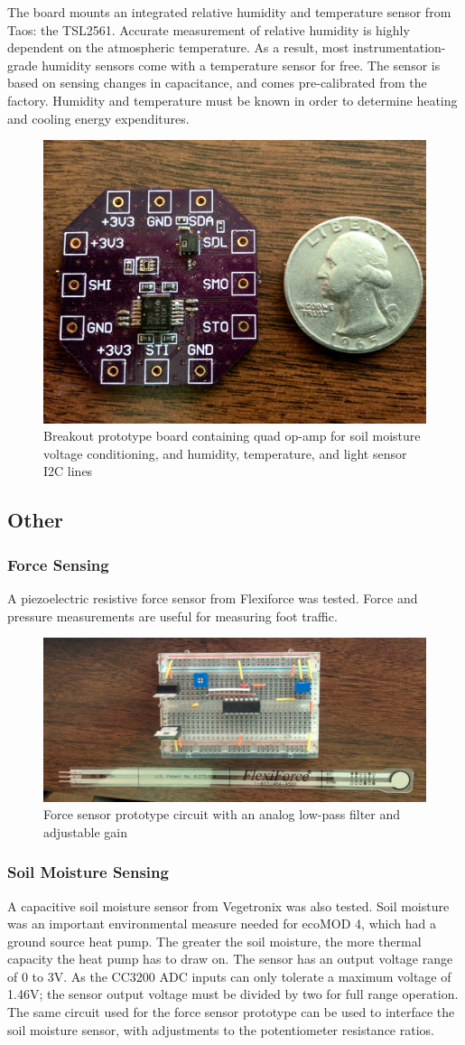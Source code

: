 The board mounts an integrated relative humidity and temperature sensor from Taos: the TSL2561. Accurate measurement of relative humidity is highly dependent on the atmospheric temperature. As a result, most instrumentation-grade humidity sensors come with a temperature sensor for free. The sensor is based on sensing changes in capacitance, and comes pre-calibrated from the factory. Humidity and temperature must be known in order to determine heating and cooling energy expenditures.

\begin{figure}[h]
\centering
\includegraphics[width=0.3\linewidth]{images/sbrk-proto}
\caption[Development breakout]{Breakout prototype board containing quad op-amp for soil moisture voltage conditioning, and humidity, temperature, and light sensor I2C lines}
\label{fig:sbrk-proto}
\end{figure}

\subsection{Other}
\subsubsection{Force Sensing}
A piezoelectric resistive force sensor from Flexiforce was tested. Force and pressure measurements are useful for measuring foot traffic. 

\begin{figure}[h]
\centering
\includegraphics[width=0.33\linewidth]{images/force-proto}
\caption[Force sensor prototype]{Force sensor prototype circuit with an analog low-pass filter and adjustable gain}
\label{fig:force-proto}
\end{figure}

\subsubsection{Soil Moisture Sensing}
A capacitive soil moisture sensor from Vegetronix was also tested. Soil moisture was an important environmental measure needed for ecoMOD 4, which had a ground source heat pump. The greater the soil moisture, the more thermal capacity the heat pump has to draw on. The sensor has an output voltage range of 0 to 3V. As the CC3200 ADC inputs can only tolerate a maximum voltage of 1.46V; the sensor output voltage must be divided by two for full range operation. The same circuit used for the force sensor prototype can be used to interface the soil moisture sensor, with adjustments to the potentiometer resistance ratios.

